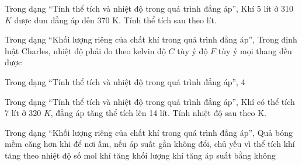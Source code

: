 \begin{ex}
Trong dạng “Tính thể tích và nhiệt độ trong quá trình đẳng áp”, Khí 5 lít ở 310 $K$ được đun đẳng áp đến 370 K. Tính thể tích sau theo lít.
\end{ex}

\begin{ex}
Trong dạng “Khối lượng riêng của chất khí trong quá trình đẳng áp”, Trong định luật Charles, nhiệt độ phải đo theo
\choice
{\True kelvin}
{độ $C$ tùy ý}
{độ $F$ tùy ý}
{mọi thang đều được}
\end{ex}


\begin{ex}
Trong dạng “Tính thể tích và nhiệt độ trong quá trình đẳng áp”, 4
\choiceTF

\end{ex}

\begin{ex}
Trong dạng “Tính thể tích và nhiệt độ trong quá trình đẳng áp”, Khí có thể tích 7 lít ở 320 $K$, đẳng áp tăng thể tích lên 14 lít. Tính nhiệt độ sau theo K.
\end{ex}

\begin{ex}
Trong dạng “Khối lượng riêng của chất khí trong quá trình đẳng áp”, Quả bóng mềm căng hơn khi để nơi ấm, nếu áp suất gần không đổi, chủ yếu vì
\choice
{\True thể tích khí tăng theo nhiệt độ}
{số mol khí tăng}
{khối lượng khí tăng}
{áp suất bằng không}
\end{ex}

